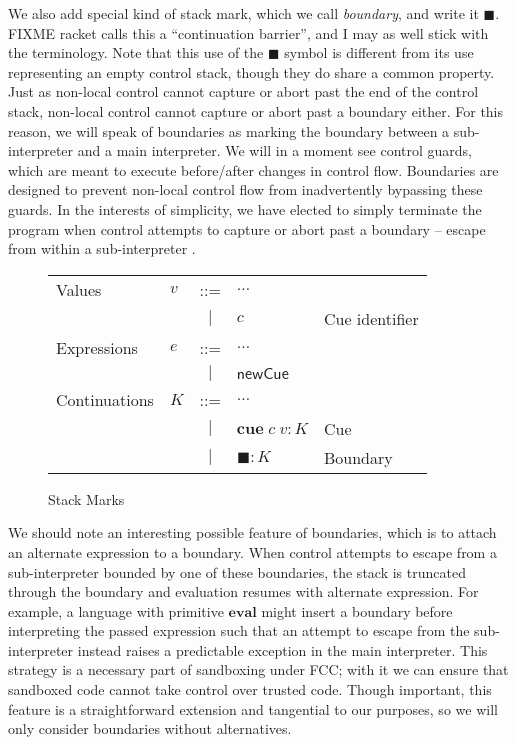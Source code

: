 \documentclass[11pt]{article}
\newcommand{\newhandler}{\textsf{newCue}}
\begin{document}
We also add special kind of stack mark, which we call \emph{boundary}, and write it $\blacksquare$.
FIXME racket calls this a ``continuation barrier'', and I may as well stick with the terminology.
Note that this use of the $\blacksquare$ symbol is different from its use representing an empty control stack, though they do share a common property.
Just as non-local control cannot capture or abort past the end of the control stack, non-local control cannot capture or abort past a boundary either.
For this reason, we will speak of boundaries as marking the boundary between a sub-interpreter and a main interpreter.
We will in a moment see control guards, which are meant to execute before/after changes in control flow.
Boundaries are designed to prevent non-local control flow from inadvertently bypassing these guards.
In the interests of simplicity, we have elected to simply terminate the program when control attempts to capture or abort past a boundary -- escape from within a sub-interpreter .

\begin{figure}[h!]
\caption{Stack Marks}
\label{fig:addCues}

\begin{tabular}{llcll}
Values & $v$ & ::= & $\ldots$ \\
& & $|$ & $c$ & Cue identifier \\
Expressions & $e$ & ::= & $\ldots$ \\
& & $|$ & $\newhandler$ \\
Continuations & $K$ & ::= & $\ldots$ \\
& & $|$ & $\textbf{cue}\;c\;v:K$ & Cue \\
& & $|$ & $\blacksquare:K$ & Boundary \\
\end{tabular}
\end{figure}

We should note an interesting possible feature of boundaries, which is to attach an alternate expression to a boundary.
When control attempts to escape from a sub-interpreter bounded by one of these boundaries, the stack is truncated through the boundary and evaluation resumes with alternate expression.
For example, a language with primitive $\mathbf{eval}$ might insert a boundary before interpreting the passed expression such that an attempt to escape from the sub-interpreter instead raises a predictable exception in the main interpreter.
This strategy is a necessary part of sandboxing under FCC; with it we can ensure that sandboxed code cannot take control over trusted code.\cite{addDelimControlProduction}
Though important, this feature is a straightforward extension and tangential to our purposes, so we will only consider boundaries without alternatives.
\end{document}

